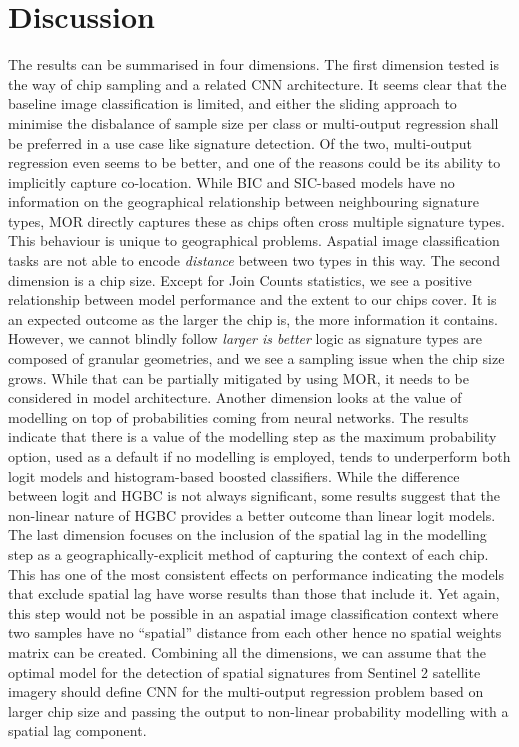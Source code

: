 \documentclass[]{interact}
\theoremstyle{plain}%
\theoremstyle{definition}
\theoremstyle{remark}
\begin{document}
\section{Discussion} %
\label{sec:discussion}

The results can be summarised in four dimensions.
The first dimension tested is the way of chip sampling and a related CNN architecture.
It seems clear that the baseline image classification is limited, and either the
sliding approach to minimise the disbalance of sample size per class or multi-output
regression shall be preferred in a use case like signature detection. Of the two,
multi-output regression even seems to be better, and one of the reasons could be its
ability to implicitly capture co-location. While BIC and SIC-based models have no
information on
the geographical relationship between neighbouring signature types, MOR directly
captures these as chips often cross multiple signature types. This behaviour is unique
to geographical problems. Aspatial image classification tasks are not able to encode
\textit{distance} between two types in this way.
The second dimension is a chip size. Except for Join Counts statistics, we see a positive
relationship between model performance and the extent to our chips cover. It is an expected
outcome as the larger the chip is, the more information it contains. However, we cannot
blindly follow \textit{larger is better} logic as signature types are composed of
granular geometries, and we see a sampling issue when the chip size grows. While that
can be partially mitigated by using MOR, it needs to be considered in model
architecture.
Another dimension looks at the value of modelling on top of probabilities coming from
neural networks. The results indicate that there is a value of the modelling step as the
maximum probability option, used as a default if no modelling is employed, tends to
underperform both logit models and histogram-based
boosted classifiers. While the difference between logit and HGBC is not always
significant, some results suggest that the non-linear nature of HGBC provides a better
outcome than linear logit models.
The last dimension focuses on the inclusion of the spatial lag in the modelling step as a
geographically-explicit method of capturing the context of each chip. This has one of
the most consistent effects on performance indicating the models that exclude spatial lag have worse
results than those that include it. Yet again, this step would not be possible in an
aspatial image classification context where two samples have no ``spatial'' distance from each
other hence no spatial weights matrix can be created.
Combining all the dimensions, we can assume that the optimal model for the detection of spatial
signatures from Sentinel 2 satellite imagery should define CNN for the multi-output
regression problem based on larger chip size and passing the output to non-linear
probability modelling with a spatial lag component.
\end{document}
